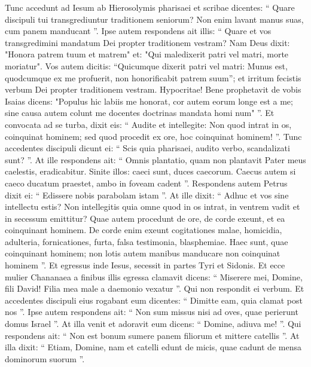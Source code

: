 \begin{biblechapter}
\begin{biblechapter}
\begin{biblechapter}
\begin{biblechapter}
\begin{biblechapter}
\begin{biblechapter}
\begin{biblechapter}
\begin{biblechapter}
\begin{biblechapter}
\begin{biblechapter}
\begin{biblechapter}
\begin{biblechapter}
\begin{biblechapter}
\begin{biblechapter}
\begin{biblechapter}
\verse Tunc accedunt ad Iesum ab Hierosolymis pharisaei et scribae dicentes: 
 \verse “ Quare discipuli tui transgrediuntur traditionem seniorum? Non enim lavant manus suas, cum panem manducant ”. 
\verse Ipse autem respondens ait illis: “ Quare et vos transgredimini mandatum Dei propter traditionem vestram? 
\verse Nam Deus dixit: "Honora patrem tuum et matrem" et: "Qui maledixerit patri vel matri, morte moriatur". 
\verse Vos autem dicitis: “Quicumque dixerit patri vel matri: Munus est, quodcumque ex me profuerit, 
\verse non honorificabit patrem suum”; et irritum fecistis verbum Dei propter traditionem vestram. 
\verse Hypocritae! Bene prophetavit de vobis Isaias dicens: 
\verse "Populus hic labiis me honorat,
 cor autem eorum longe est a me;
 \verse sine causa autem colunt me
 docentes doctrinas mandata homi num" ”.
 \verse Et convocata ad se turba, dixit eis: “ Audite et intellegite: 
\verse Non quod intrat in os, coinquinat hominem; sed quod procedit ex ore, hoc coinquinat hominem! ”.
 \verse Tunc accedentes discipuli dicunt ei: “ Scis quia pharisaei, audito verbo, scandalizati sunt? ”. 
\verse At ille respondens ait: “ Omnis plantatio, quam non plantavit Pater meus caelestis, eradicabitur. 
\verse Sinite illos: caeci sunt, duces caecorum. Caecus autem si caeco ducatum praestet, ambo in foveam cadent ”. 
 \verse Respondens autem Petrus dixit ei: “ Edissere nobis parabolam istam ”. 
\verse At ille dixit: “ Adhuc et vos sine intellectu estis? 
\verse Non intellegitis quia omne quod in os intrat, in ventrem vadit et in secessum emittitur? 
\verse Quae autem procedunt de ore, de corde exeunt, et ea coinquinant hominem. 
\verse De corde enim exeunt cogitationes malae, homicidia, adulteria, fornicationes, furta, falsa testimonia, blasphemiae. 
\verse Haec sunt, quae coinquinant hominem; non lotis autem manibus manducare non coinquinat hominem ”.
 \verse Et egressus inde Iesus, secessit in partes Tyri et Sidonis. 
\verse Et ecce mulier Chananaea a finibus illis egressa clamavit dicens: “ Miserere mei, Domine, fili David! Filia mea male a daemonio vexatur ”. 
\verse Qui non respondit ei verbum.
 Et accedentes discipuli eius rogabant eum dicentes: “ Dimitte eam, quia clamat post nos ”. 
\verse Ipse autem respondens ait: “ Non sum missus nisi ad oves, quae perierunt domus Israel ”. 
\verse At illa venit et adoravit eum dicens: “ Domine, adiuva me! ”. 
\verse Qui respondens ait: “ Non est bonum sumere panem filiorum et mittere catellis ”. 
\verse At illa dixit: “ Etiam, Domine, nam et catelli edunt de micis, quae cadunt de mensa dominorum suorum ”. 

\end{biblechapter}
\end{biblechapter}
\end{biblechapter}
\end{biblechapter}
\end{biblechapter}
\end{biblechapter}
\end{biblechapter}
\end{biblechapter}
\end{biblechapter}
\end{biblechapter}
\end{biblechapter}
\end{biblechapter}
\end{biblechapter}
\end{biblechapter}
\end{biblechapter}
